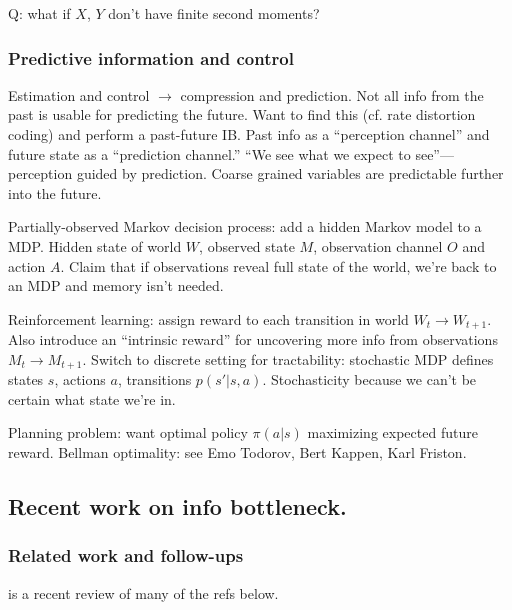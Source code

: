 \documentclass[notitlepage,openany,11pt]{report}
\theoremstyle{plain}%
\numberwithin{equation}{section}
\begin{document}
Q: what if $X$, $Y$ don't have finite second moments?

\subsubsection{Predictive information and control} Estimation and control $\rightarrow$ compression and prediction. Not all info from the past is usable for predicting the future. Want to find this (cf. rate distortion coding) and perform a past-future IB. Past info as a ``perception channel'' and future state as a ``prediction channel.'' ``We see what we expect to see''--- perception guided by prediction. Coarse grained variables are predictable further into the future.

Partially-observed Markov decision process: add a hidden Markov model to a MDP. Hidden state of world $W$, observed state $M$, observation channel $O$ and action $A$. Claim that if observations reveal full state of the world, we're back to an MDP and memory isn't needed. 

Reinforcement learning: assign reward to each transition in world $W_{t} \rightarrow W_{t+1}$. Also introduce an ``intrinsic reward'' for uncovering more info from observations $M_{t} \rightarrow M_{t+1}$. Switch to discrete setting for tractability: stochastic MDP defines states $s$, actions $a$, transitions $p(s'|s,a)$. Stochasticity because we can't be certain what state we're in. 

Planning problem: want optimal policy $\pi(a|s)$ maximizing expected future reward. Bellman optimality: see Emo Todorov, Bert Kappen, Karl Friston. 


\subsection{Recent work on info bottleneck.}


\subsubsection{Related work and follow-ups}

\cite{GoldfeldPolyanskiy:20} is a recent review of many of the refs below.
\end{document}
